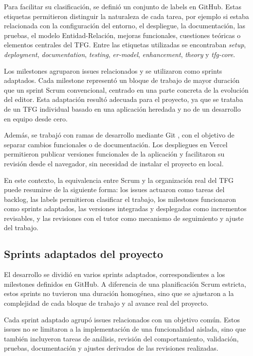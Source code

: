 Para facilitar su clasificación, se definió un conjunto de labels en GitHub. Estas etiquetas permitieron distinguir la naturaleza de cada tarea, por ejemplo si estaba relacionada con la configuración del entorno, el despliegue, la documentación, las pruebas, el modelo Entidad-Relación, mejoras funcionales, cuestiones teóricas o elementos centrales del TFG. Entre las etiquetas utilizadas se encontraban \textit{setup}, \textit{deployment}, \textit{documentation}, \textit{testing}, \textit{er-model}, \textit{enhancement}, \textit{theory} y \textit{tfg-core}.

Los milestones agruparon issues relacionados y se utilizaron como sprints adaptados. Cada milestone representó un bloque de trabajo de mayor duración que un sprint Scrum convencional, centrado en una parte concreta de la evolución del editor. Esta adaptación resultó adecuada para el proyecto, ya que se trataba de un TFG individual basado en una aplicación heredada y no de un desarrollo en equipo desde cero.

Además, se trabajó con ramas de desarrollo mediante Git \cite{git-docs}, con el objetivo de separar cambios funcionales o de documentación. Los despliegues en Vercel \cite{vercel} permitieron publicar versiones funcionales de la aplicación y facilitaron su revisión desde el navegador, sin necesidad de instalar el proyecto en local.

En este contexto, la equivalencia entre Scrum y la organización real del TFG puede resumirse de la siguiente forma: los issues actuaron como tareas del backlog, las labels permitieron clasificar el trabajo, los milestones funcionaron como sprints adaptados, las versiones integradas y desplegadas como incrementos revisables, y las revisiones con el tutor como mecanismo de seguimiento y ajuste del trabajo.

\subsection{Sprints adaptados del proyecto}

El desarrollo se dividió en varios sprints adaptados, correspondientes a los milestones definidos en GitHub. A diferencia de una planificación Scrum estricta, estos sprints no tuvieron una duración homogénea, sino que se ajustaron a la complejidad de cada bloque de trabajo y al avance real del proyecto.

Cada sprint adaptado agrupó issues relacionados con un objetivo común. Estos issues no se limitaron a la implementación de una funcionalidad aislada, sino que también incluyeron tareas de análisis, revisión del comportamiento, validación, pruebas, documentación y ajustes derivados de las revisiones realizadas.

